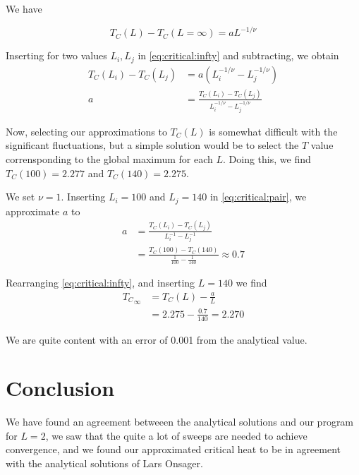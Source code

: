 \documentclass[a4paper]{article}
\begin{document}
We have

\begin{equation}
    T_C(L)-T_C(L=\infty) = aL^{-1/\nu}
    \label{eq:critical:infty}
\end{equation}


Inserting for two values $L_i, L_j$ in \ref{eq:critical:infty} and subtracting, we obtain
\begin{align}
    T_C(L_i) - T_C(L_j) &= a(L_i^{-1/\nu} - L_j^{-1/\nu}) \nonumber \\
    a &= \frac{T_C(L_i) - T_C(L_j)}{L_i^{-1/\nu} - L_j^{-1/\nu}}
    \label{eq:critical:pair}
\end{align}

Now, selecting our approximations to $T_C(L)$ is somewhat difficult with the significant fluctuations, but a simple solution would be to select the $T$ value corrensponding to the global maximum for each $L$. Doing this, we find $T_C(100) = 2.277$ and $T_C(140) = 2.275$.

We set $\nu=1$. Inserting $L_i = 100$ and $L_j = 140$ in \ref{eq:critical:pair}, we approximate $a$ to
\begin{align}
    a &= \frac{T_C(L_i) - T_C(L_j)}{L_i^{-1} - L_j^{-1}} \nonumber \\
     &= \frac{T_C(100) - T_C(140)}{\frac{1}{100} - \frac{1}{140}}
     \approx 0.7
\end{align}

Rearranging \ref{eq:critical:infty}, and inserting $L=140$ we find
\begin{align}
    {T_C}_\infty &= T_C(L) - \frac{a}{L} \nonumber \\
    &= 2.275 - \frac{0.7}{140}
    = 2.270
\end{align}

We are quite content with an error of 0.001 from the analytical value.

\section{Conclusion}\label{sec:conclusion}
We have found an agreement betweeen the analytical solutions and our program for $L=2$, we saw that the quite a lot of sweeps are needed to achieve convergence, and we found our approximated critical heat to be in agreement with the analytical solutions of Lars Onsager.

%
%

{}
\end{document}
